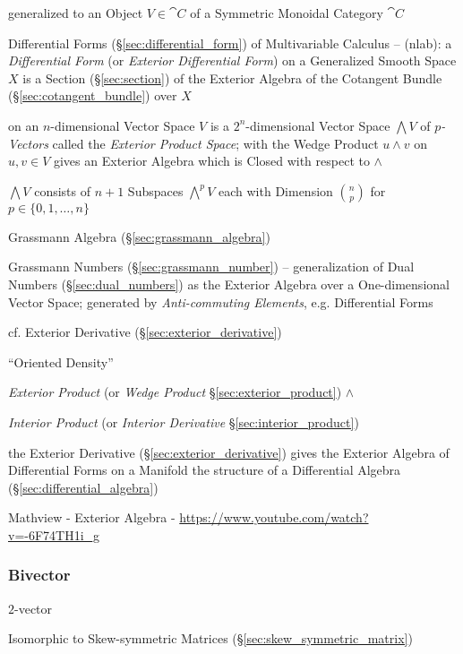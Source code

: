 generalized to an Object $V \in \cat{C}$ of a Symmetric Monoidal Category
$\cat{C}$

\fist Differential Forms (\S\ref{sec:differential_form}) of Multivariable
Calculus -- (nlab): a \emph{Differential Form} (or \emph{Exterior Differential
  Form}) on a Generalized Smooth Space $X$ is a Section (\S\ref{sec:section}) of
the Exterior Algebra of the Cotangent Bundle (\S\ref{sec:cotangent_bundle}) over
$X$

\asterism

on an $n$-dimensional Vector Space $V$ is a $2^n$-dimensional Vector Space
$\bigwedge V$ of \emph{$p$-Vectors} called the \emph{Exterior Product Space};
with the Wedge Product $u \wedge v$ on $u,v \in V$ gives an Exterior Algebra
which is Closed with respect to $\wedge$

$\bigwedge V$ consists of $n+1$ Subspaces $\bigwedge^p{V}$ each with Dimension
$\binom{n}{p}$ for $p \in \{0, 1, \ldots, n\}$

Grassmann Algebra (\S\ref{sec:grassmann_algebra})

\fist Grassmann Numbers (\S\ref{sec:grassmann_number}) -- generalization of Dual
Numbers (\S\ref{sec:dual_numbers}) as the Exterior Algebra over a
One-dimensional Vector Space; generated by \emph{Anti-commuting Elements}, e.g.
Differential Forms

\fist cf. Exterior Derivative (\S\ref{sec:exterior_derivative}) %

``Oriented Density'' %

\emph{Exterior Product} (or \emph{Wedge Product} \S\ref{sec:exterior_product})
$\wedge$

\emph{Interior Product} (or \emph{Interior Derivative}
\S\ref{sec:interior_product})

the Exterior Derivative (\S\ref{sec:exterior_derivative}) gives the Exterior
Algebra of Differential Forms on a Manifold the structure of a Differential
Algebra (\S\ref{sec:differential_algebra})

\asterism

Mathview - Exterior Algebra - \url{https://www.youtube.com/watch?v=-6F74TH1i_g}



\subsubsection{Bivector}\label{sec:bivector}

$2$-vector

Isomorphic to Skew-symmetric Matrices (\S\ref{sec:skew_symmetric_matrix})

